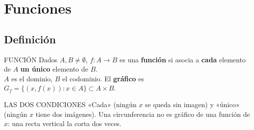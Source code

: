 \chapter{Funciones}

\section{Definición}
\apuntes
\begin{sello}{FUNCIÓN}
Dados $A,B\neq\emptyset$, $f:A\to B$ es una \textbf{función} si asocia a \textbf{cada} elemento de $A$ \textbf{un único} elemento de $B$.\\[3pt]
$A$ es el dominio, $B$ el codominio. El \textbf{gráfico} es $G_f=\{(x,f(x)):x\in A\}\subset A\times B$.
\end{sello}
\begin{trampa}{LAS DOS CONDICIONES}
«Cada» (ningún $x$ se queda sin imagen) y «único» (ningún $x$ tiene dos imágenes). Una circunferencia no es gráfico de una función de $x$: una recta vertical la corta dos veces.
\end{trampa}

